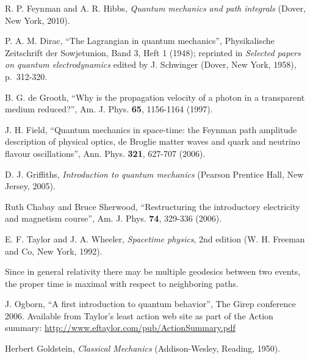 \documentclass[prb,oncolumn,12pt]{revtex4-2}
\begin{document}
\begin{thebibliography}{99}
 R. P. Feynman and A. R. Hibbs, \textit{Quantum mechanics and path integrals} (Dover, New York, 2010).

 P. A. M. Dirac, ``The Lagrangian in quantum mechanics'', Physikalische Zeitschrift der Sowjetunion, Band 3, Heft 1 (1948); reprinted in  \textit{Selected papers on quantum electrodynamics} edited by J. Schwinger (Dover, New York, 1958), p.~312-320.

 B. G. de Grooth, ``Why is the propagation velocity of a photon in a transparent medium reduced?'', Am. J. Phys. \textbf{65}, 1156-1164 (1997).

 J. H. Field, ``Quantum mechanics in space-time: the Feynman path amplitude description of physical optics, de Broglie matter waves and quark and neutrino flavour oscillations'', Ann. Phys. \textbf{321}, 627-707 (2006).

  D. J. Griffiths, \textit{Introduction to quantum mechanics} (Pearson Prentice Hall, New Jersey, 2005).

 Ruth Chabay and Bruce Sherwood, ``Restructuring the introductory electricity and magnetism course'', Am. J. Phys. \textbf{74}, 329-336 (2006).

 E. F. Taylor and J. A. Wheeler, \textit{Spacetime physics}, 2nd edition (W. H. Freeman and Co, New York, 1992).

 Since in general relativity there may be multiple geodesics between two events, the proper time is maximal with respect to neighboring paths. 

 J. Ogborn, ``A first introduction to quantum behavior'', The Girep conference 2006. Available from Taylor's least action web site \cite{Resources} as part of the Action summary: \url{http://www.eftaylor.com/pub/ActionSummary.pdf}

 Herbert Goldstein, \textit{Classical Mechanics} (Addison-Wesley, Reading, 1950).

\end{thebibliography}
\end{document}

